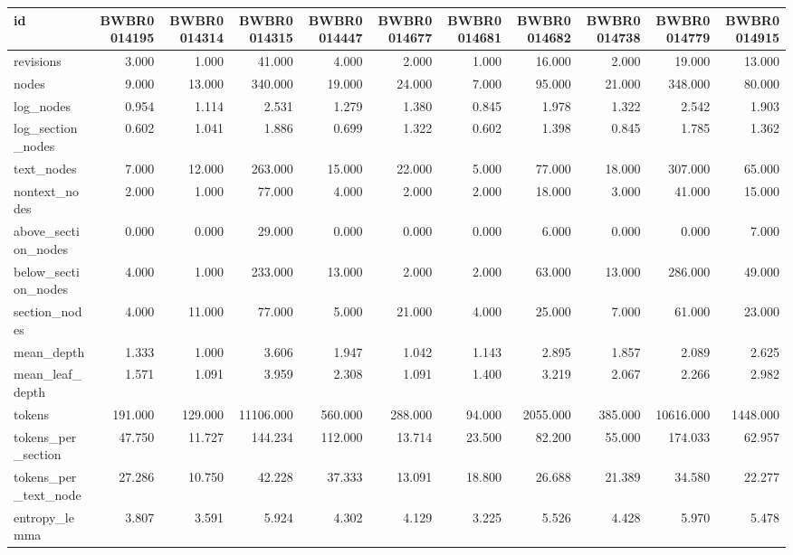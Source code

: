 \begin{tabular}{lrrrrrrrrrr}
\toprule
id & BWBR0014195 & BWBR0014314 & BWBR0014315 & BWBR0014447 & BWBR0014677 & BWBR0014681 & BWBR0014682 & BWBR0014738 & BWBR0014779 & BWBR0014915 \\
\midrule
revisions & 3.000 & 1.000 & 41.000 & 4.000 & 2.000 & 1.000 & 16.000 & 2.000 & 19.000 & 13.000 \\
\cline{1-11}
nodes & 9.000 & 13.000 & 340.000 & 19.000 & 24.000 & 7.000 & 95.000 & 21.000 & 348.000 & 80.000 \\
\cline{1-11}
log\_nodes & 0.954 & 1.114 & 2.531 & 1.279 & 1.380 & 0.845 & 1.978 & 1.322 & 2.542 & 1.903 \\
\cline{1-11}
log\_section\_nodes & 0.602 & 1.041 & 1.886 & 0.699 & 1.322 & 0.602 & 1.398 & 0.845 & 1.785 & 1.362 \\
\cline{1-11}
text\_nodes & 7.000 & 12.000 & 263.000 & 15.000 & 22.000 & 5.000 & 77.000 & 18.000 & 307.000 & 65.000 \\
\cline{1-11}
nontext\_nodes & 2.000 & 1.000 & 77.000 & 4.000 & 2.000 & 2.000 & 18.000 & 3.000 & 41.000 & 15.000 \\
\cline{1-11}
above\_section\_nodes & 0.000 & 0.000 & 29.000 & 0.000 & 0.000 & 0.000 & 6.000 & 0.000 & 0.000 & 7.000 \\
\cline{1-11}
below\_section\_nodes & 4.000 & 1.000 & 233.000 & 13.000 & 2.000 & 2.000 & 63.000 & 13.000 & 286.000 & 49.000 \\
\cline{1-11}
section\_nodes & 4.000 & 11.000 & 77.000 & 5.000 & 21.000 & 4.000 & 25.000 & 7.000 & 61.000 & 23.000 \\
\cline{1-11}
mean\_depth & 1.333 & 1.000 & 3.606 & 1.947 & 1.042 & 1.143 & 2.895 & 1.857 & 2.089 & 2.625 \\
\cline{1-11}
mean\_leaf\_depth & 1.571 & 1.091 & 3.959 & 2.308 & 1.091 & 1.400 & 3.219 & 2.067 & 2.266 & 2.982 \\
\cline{1-11}
tokens & 191.000 & 129.000 & 11106.000 & 560.000 & 288.000 & 94.000 & 2055.000 & 385.000 & 10616.000 & 1448.000 \\
\cline{1-11}
tokens\_per\_section & 47.750 & 11.727 & 144.234 & 112.000 & 13.714 & 23.500 & 82.200 & 55.000 & 174.033 & 62.957 \\
\cline{1-11}
tokens\_per\_text\_node & 27.286 & 10.750 & 42.228 & 37.333 & 13.091 & 18.800 & 26.688 & 21.389 & 34.580 & 22.277 \\
\cline{1-11}
entropy\_lemma & 3.807 & 3.591 & 5.924 & 4.302 & 4.129 & 3.225 & 5.526 & 4.428 & 5.970 & 5.478 \\

\end{tabular}

